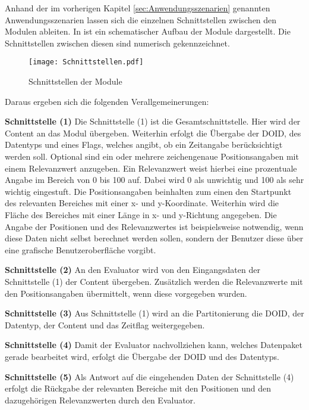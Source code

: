 Anhand der im vorherigen Kapitel \ref{sec:Anwendungsszenarien} genannten Anwendungsszenarien lassen
sich die einzelnen Schnittstellen zwischen den Modulen ableiten. In
 ist ein schematischer Aufbau der Module
dargestellt. Die Schnittstellen zwischen diesen sind numerisch gekennzeichnet.

\begin{figure}[H]
\centering
\texttt{[image: Schnittstellen.pdf]}
\caption{Schnittstellen der Module}
\label{fig:Schnittstellen}
\end{figure}

Daraus ergeben sich die folgenden Verallgemeinerungen:

\textbf{Schnittstelle (1)}\newline
Die Schnittstelle (1) ist die Gesamtschnittstelle. Hier wird der
Content an das Modul übergeben. Weiterhin erfolgt die Übergabe der DOID, des
Datentyps und eines Flags, welches angibt, ob ein Zeitangabe berücksichtigt
werden soll.
Optional sind ein oder mehrere zeichengenaue Positionsangaben mit einem
Relevanzwert anzugeben. Ein Relevanzwert weist hierbei eine
prozentuale Angabe im Bereich von 0 bis 100 auf. Dabei wird 0 als unwichtig und
100 als sehr wichtig eingestuft. Die Positionsangaben beinhalten zum einen den
Startpunkt des relevanten Bereiches mit einer x- und y-Koordinate. Weiterhin
wird die Fläche des Bereiches mit einer Länge in x- und y-Richtung angegeben.
Die Angabe der Positionen und des Relevanzwertes ist beispielsweise notwendig,
wenn diese Daten nicht selbst berechnet werden sollen, sondern der Benutzer
diese über eine grafische Benutzeroberfläche vorgibt.

\textbf{Schnittstelle (2)} \newline
An den Evaluator wird von den Eingangsdaten der Schnittstelle (1)
der Content übergeben. Zusätzlich werden die Relevanzwerte mit den
Positionsangaben übermittelt, wenn diese vorgegeben wurden.

\textbf{Schnittstelle (3)} \newline
Aus Schnittstelle (1) wird an die Partitonierung
die DOID, der Datentyp, der Content und das Zeitflag weitergegeben.

\textbf{Schnittstelle (4)} \newline
Damit der Evaluator nachvollziehen kann, welches Datenpaket gerade bearbeitet
wird, erfolgt die Übergabe der DOID und des Datentyps.  

\textbf{Schnittstelle (5)} \newline
Als Antwort auf die eingehenden Daten der Schnittstelle (4)
erfolgt die Rückgabe der relevanten Bereiche mit den Positionen und den
dazugehörigen Relevanzwerten durch den Evaluator.

